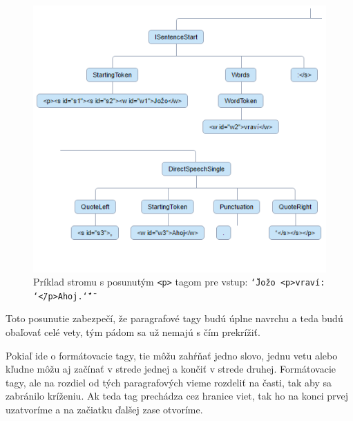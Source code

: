 \documentclass[12pt,a4paper]{report}
\theoremstyle{definition}
\theoremstyle{remark}
\begin{document}
\begin{figure}[H]
\centering
\includegraphics[scale=2.5]{adjustedPTags}
\captionsetup{width=.7\linewidth}
\caption{Príklad stromu s posunutým \texttt{<p>} tagom pre vstup: \texttt{\char`\"Jožo <p>vraví: \char`\"</p>Ahoj.\char`\"\char`\"}}
\end{figure}
Toto posunutie zabezpečí, že paragrafové tagy budú úplne navrchu a teda budú obaľovať celé vety, tým pádom sa už nemajú s čím prekrížiť.

Pokiaľ ide o formátovacie tagy, tie môžu zahŕňať jedno slovo, jednu vetu alebo kľudne môžu aj začínať v strede jednej a končiť v strede druhej. Formátovacie tagy, ale na rozdiel od tých paragrafových vieme rozdeliť na časti, tak aby sa zabránilo kríženiu. Ak teda tag prechádza cez hranice viet, tak ho na konci prvej uzatvoríme a na začiatku ďalšej zase otvoríme.
\end{document}

